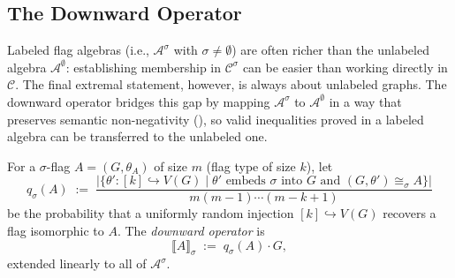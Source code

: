 \documentclass{article}
\begin{document}

\subsection{The Downward Operator}
Labeled flag algebras (i.e., $\mathcal{A}^\sigma$ with $\sigma \neq \emptyset$) are often
richer than the unlabeled algebra $\mathcal{A}^\emptyset$: establishing membership
in $\mathcal{C}^\sigma$ can be easier than working directly in $\mathcal{C}$.
The final extremal statement, however, is always about unlabeled graphs.
The downward operator bridges this gap by mapping $\mathcal{A}^\sigma$ to
$\mathcal{A}^\emptyset$ in a way that preserves semantic non-negativity
(), so valid inequalities proved in a labeled algebra
can be transferred to the unlabeled one.

For a $\sigma$-flag $A=(G,\theta_A)$ of size $m$ (flag type of size $k$), let
\[
  q_\sigma(A)
  \;:=\;
  \frac{
    \bigl|\{\theta' : [k]\hookrightarrow V(G)
       \mid \theta' \text{ embeds }\sigma\text{ into }G
       \text{ and } (G,\theta')\cong_\sigma A\}\bigr|}
       {m(m-1)\cdots(m-k+1)}
\]
be the probability that a uniformly random injection $[k]\hookrightarrow V(G)$
recovers a flag isomorphic to $A$.
The \emph{downward operator} is
\[
  \llbracket A \rrbracket_\sigma
  \;:=\;
  q_\sigma(A)\cdot G,
\]
extended linearly to all of $\mathcal{A}^\sigma$.
\end{document}
